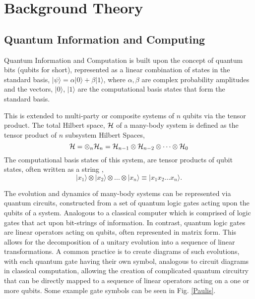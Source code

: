 \section{Background Theory}
\subsection{Quantum Information and Computing}
\vspace{-0.15in}
Quantum Information and Computation is built upon the concept of quantum bits (qubits for short), represented as a linear
combination of states in the standard basis,
$|\psi\rangle = \alpha |0\rangle + \beta |1\rangle$, where $\alpha, \beta$ are complex probability amplitudes
and the vectors, $|0\rangle$, $|1\rangle$ are the computational basis states that form the standard basis.

This is extended to multi-party or composite systems of $n$ qubits via the tensor product. The total Hilbert space, $\cal{H}$ of
a many-body system is defined as the tensor product of $n$ subsystem Hilbert Spaces,
\begin{equation}
    {\cal{H}} = \otimes_n {\cal{H}}_n = {\cal{H}}_{n-1} \otimes {\cal{H}}_{n-2} \otimes \dots \otimes {\cal{H}}_0
\end{equation}
The computational basis states of this system, are tensor products of qubit states, often written as a string \cite{schumacher_westmoreland_2010},
\[|x_1\rangle \otimes |x_2\rangle \otimes ... \otimes |x_n\rangle \equiv |x_1 x_2... x_n \rangle. \]

The evolution and dynamics of many-body systems can be represented via quantum circuits, constructed from a set of quantum logic gates acting
upon the qubits of a system. Analogous to a classical computer which is comprised of logic gates that act upon
bit-strings of information. In contrast, quantum logic gates are linear operators acting
on qubits, often represented in matrix form. This allows for the decomposition of a unitary evolution into a
sequence of linear transformations. A common practice is to create
diagrams of such evolutions, with each quantum gate having their own symbol, analogous to circuit diagrams in classical
computation, allowing the creation of complicated quantum circuitry that can be directly mapped to a sequence of linear
operators acting on a one or more qubits. Some example gate symbols can be seen in Fig. \ref{Paulis}.




